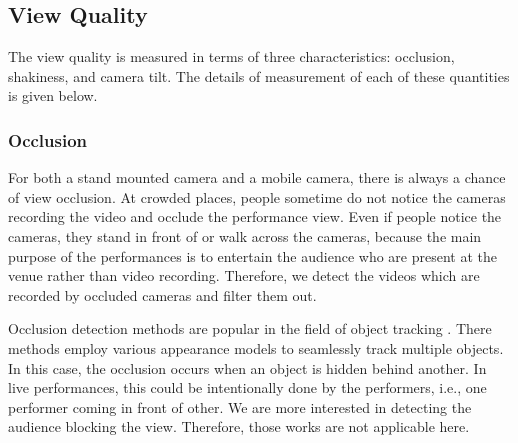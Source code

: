 \documentclass{sig-alternate}
\begin{document}
\subsection{View Quality}
The view quality is measured in terms of three characteristics: occlusion, shakiness, and camera tilt. The details of measurement of each of these quantities is given below. 
\subsubsection{Occlusion}
For both a stand mounted camera and a mobile camera, there is always a chance of view occlusion. At crowded places, people sometime do not notice the cameras recording the video and occlude the performance view. Even if people notice the cameras, they stand in front of or walk across the cameras, because the main purpose of the performances is to entertain the audience who are present at the venue rather than video recording. Therefore, we detect the videos which are recorded by occluded cameras and ﬁlter them out.

Occlusion detection methods are popular in the field of object tracking \cite{frakes1992information}. There methods employ various appearance models to seamlessly track multiple objects. In this case, the occlusion occurs when an object is hidden behind another. In live performances, this could be intentionally done by the performers, i.e., one performer coming in front of other. We are more interested in detecting the audience blocking the view. Therefore, those works are not applicable here.
\end{document}
